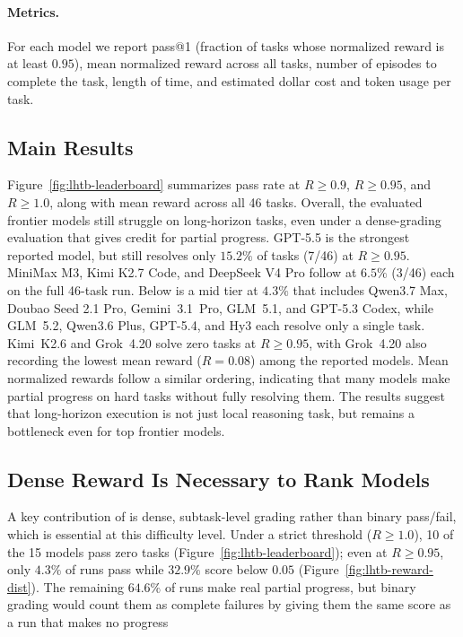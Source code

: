 \paragraph{Metrics.}
For each model we report pass@1 (fraction of tasks whose normalized reward is at least $0.95$), mean normalized reward across all tasks, number of episodes to complete the task, length of time, and estimated dollar cost and token usage per task.

% 

\subsection{Main Results}

Figure~\ref{fig:lhtb-leaderboard} summarizes pass rate at $R\geq0.9$, $R\geq0.95$, and $R\geq1.0$, along with mean reward across all 46 tasks.
%
Overall, the evaluated frontier models still struggle on long-horizon tasks, even under a dense-grading evaluation that gives credit for partial progress.
%
GPT-5.5 is the strongest reported model, but still resolves only $15.2\%$ of tasks (7/46) at $R\geq0.95$.
MiniMax M3, Kimi K2.7 Code, and DeepSeek V4 Pro follow at $6.5\%$ (3/46) each on the full 46-task run.
%
Below is a mid tier at $4.3\%$ that includes Qwen3.7 Max, Doubao Seed 2.1 Pro, Gemini~3.1~Pro, GLM~5.1, and GPT-5.3 Codex, while GLM~5.2, Qwen3.6 Plus, GPT-5.4, and Hy3 each resolve only a single task.
%
Kimi~K2.6 and Grok~4.20 solve zero tasks at $R\geq0.95$, with Grok~4.20 also recording the lowest mean reward ($R=0.08$) among the reported models.
%
Mean normalized rewards follow a similar ordering, indicating that many models make partial progress on hard tasks without fully resolving them.
%
The results suggest that long-horizon execution is not just local reasoning task, but remains a bottleneck even for top frontier models.





\subsection{Dense Reward Is Necessary to Rank Models}
\label{sec:analysis-partial-credit}

A key contribution of \ours{} is dense, subtask-level grading rather than binary pass/fail, which is essential at this difficulty level.
%
Under a strict threshold ($R \geq 1.0$), 10 of the 15 models pass zero tasks (Figure~\ref{fig:lhtb-leaderboard}); even at $R \geq 0.95$, only $4.3\%$ of runs pass while $32.9\%$ score below $0.05$ (Figure~\ref{fig:lhtb-reward-dist}).
%
The remaining $64.6\%$ of runs make real partial progress, but binary grading would count them as complete failures by giving them the same score as a run that makes no progress

